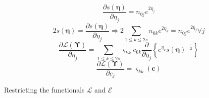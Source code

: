 \documentclass[aps,preprint]{revtex4}%
\begin{document}
\begin{equation}
\frac{\partial\mathit{s}\left(  \mathbf{\eta}\right)  }{\partial\eta_{j}%
}=n_{0j}e^{2\eta_{j}}%
\end{equation}%
\begin{equation}
2\mathit{s}\left(  \mathbf{\eta}\right)  =\frac{\partial\mathit{s}\left(
\mathbf{\eta}\right)  }{\partial\eta_{j}}\Rightarrow2\sum_{1\leq k\leq
2s}n_{0k}e^{2\eta_{k}}=n_{0j}e^{2\eta_{j}}\forall j
\end{equation}%
\[
\frac{\partial\mathcal{L}\left(  \mathbf{\Upsilon}\right)  }{\partial\eta_{j}%
}=\sum_{1\leq k\leq2s}\varsigma_{kk}c_{0k}\frac{\partial}{\partial\eta_{j}%
}\left\{  e^{\eta_{k}}\mathit{s}\left(  \mathbf{\eta}\right)  ^{-\frac{1}{2}%
}\right\}
\]%
\[
\frac{\partial\mathcal{L}\left(  \mathbf{\Upsilon}\right)  }{\partial c_{j}%
}=\varsigma_{kk}\left(  \mathbf{c}\right)
\]


Restricting the functionals $\mathcal{L}$ and $\mathcal{E}$
\end{document}
